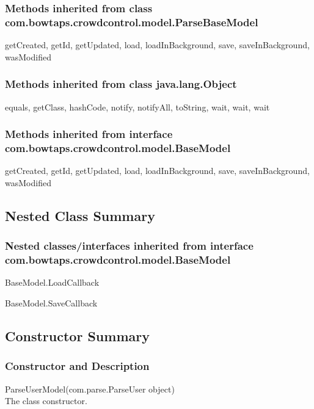 \subsubsection{Methods inherited from class com.bowtaps.crowdcontrol.model.ParseBaseModel}

getCreated, getId, getUpdated, load, loadInBackground, save, saveInBackground, wasModified\\

\subsubsection{Methods inherited from class java.lang.Object}

equals, getClass, hashCode, notify, notifyAll, toString, wait, wait, wait\\

\subsubsection{Methods inherited from interface com.bowtaps.crowdcontrol.model.BaseModel}

getCreated, getId, getUpdated, load, loadInBackground, save, saveInBackground, wasModified\\



\subsection{Nested Class Summary}

\subsubsection{Nested classes/interfaces inherited from interface com.bowtaps.crowdcontrol.model.BaseModel}
\begin{DoxyCompactItemize}
\item  \hypertarget{class_BaseModel.Android.LoadCallBack}{BaseModel.LoadCallback}
\item  \hypertarget{class_BaseModel.Android.SaveCallback}{BaseModel.SaveCallback}
\end{DoxyCompactItemize} 


\subsection{Constructor Summary}

\subsubsection{Constructor and Description}
ParseUserModel(com.parse.ParseUser object)\\
The class constructor.\\


